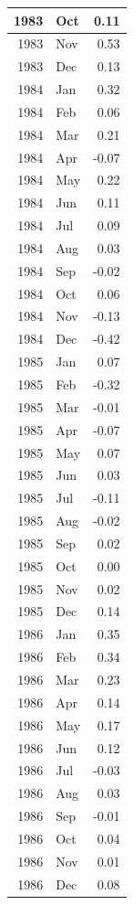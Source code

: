 \documentclass[
]{article}
\begin{document}
\begin{table}[H]
\begin{tabular}[t]{r|l|r}
\hline
1983 & Oct & 0.11\\
\hline
1983 & Nov & 0.53\\
\hline
1983 & Dec & 0.13\\
\hline
1984 & Jan & 0.32\\
\hline
1984 & Feb & 0.06\\
\hline
1984 & Mar & 0.21\\
\hline
1984 & Apr & -0.07\\
\hline
1984 & May & 0.22\\
\hline
1984 & Jun & 0.11\\
\hline
1984 & Jul & 0.09\\
\hline
1984 & Aug & 0.03\\
\hline
1984 & Sep & -0.02\\
\hline
1984 & Oct & 0.06\\
\hline
1984 & Nov & -0.13\\
\hline
1984 & Dec & -0.42\\
\hline
1985 & Jan & 0.07\\
\hline
1985 & Feb & -0.32\\
\hline
1985 & Mar & -0.01\\
\hline
1985 & Apr & -0.07\\
\hline
1985 & May & 0.07\\
\hline
1985 & Jun & 0.03\\
\hline
1985 & Jul & -0.11\\
\hline
1985 & Aug & -0.02\\
\hline
1985 & Sep & 0.02\\
\hline
1985 & Oct & 0.00\\
\hline
1985 & Nov & 0.02\\
\hline
1985 & Dec & 0.14\\
\hline
1986 & Jan & 0.35\\
\hline
1986 & Feb & 0.34\\
\hline
1986 & Mar & 0.23\\
\hline
1986 & Apr & 0.14\\
\hline
1986 & May & 0.17\\
\hline
1986 & Jun & 0.12\\
\hline
1986 & Jul & -0.03\\
\hline
1986 & Aug & 0.03\\
\hline
1986 & Sep & -0.01\\
\hline
1986 & Oct & 0.04\\
\hline
1986 & Nov & 0.01\\
\hline
1986 & Dec & 0.08\\

\end{tabular}
\end{table}
\end{document}
